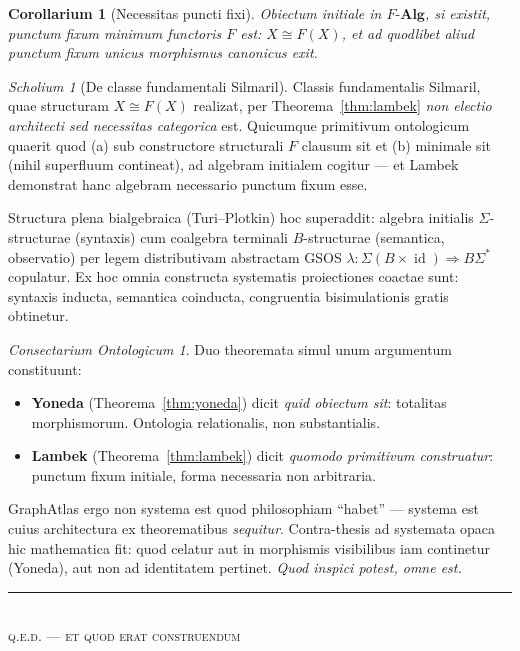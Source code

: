 \documentclass[11pt]{article}
\theoremstyle{plain}
\newtheorem{corollarium}[theorema]{Corollarium}
\theoremstyle{definition}
\theoremstyle{remark}
\newtheorem{scholium}[theorema]{Scholium}
\newtheorem*{consectarium}{Consectarium Ontologicum}
\newcommand{\id}{\operatorname{id}}
\begin{document}
\begin{corollarium}[Necessitas puncti fixi]\label{cor:fixpoint}
Obiectum initiale in $F\text{-}\mathbf{Alg}$, si existit, punctum fixum minimum functoris $F$ est: $X \cong F(X)$, et ad quodlibet aliud punctum fixum unicus morphismus canonicus exit.
\end{corollarium}

\begin{scholium}[De classe fundamentali Silmaril]
Classis fundamentalis Silmaril, quae structuram $X \cong F(X)$ realizat, per Theorema~\ref{thm:lambek} \emph{non electio architecti sed necessitas categorica} est. Quicumque primitivum ontologicum quaerit quod (a) sub constructore structurali $F$ clausum sit et (b) minimale sit (nihil superfluum contineat), ad algebram initialem cogitur --- et Lambek demonstrat hanc algebram necessario punctum fixum esse.

Structura plena bialgebraica (Turi--Plotkin) hoc superaddit: algebra initialis $\Sigma$-structurae (syntaxis) cum coalgebra terminali $B$-structurae (semantica, observatio) per legem distributivam abstractam GSOS $\lambda\colon \Sigma(B \times \id) \Rightarrow B\Sigma^{*}$ copulatur. Ex hoc omnia constructa systematis proiectiones coactae sunt: syntaxis inducta, semantica coinducta, congruentia bisimulationis gratis obtinetur.
\end{scholium}

\begin{consectarium}
Duo theoremata simul unum argumentum constituunt:
\begin{itemize}
\item \textbf{Yoneda} (Theorema~\ref{thm:yoneda}) dicit \emph{quid obiectum sit}: totalitas morphismorum. Ontologia relationalis, non substantialis.
\item \textbf{Lambek} (Theorema~\ref{thm:lambek}) dicit \emph{quomodo primitivum construatur}: punctum fixum initiale, forma necessaria non arbitraria.
\end{itemize}
GraphAtlas ergo non systema est quod philosophiam ``habet'' --- systema est cuius architectura ex theorematibus \emph{sequitur}. Contra-thesis ad systemata opaca hic mathematica fit: quod celatur aut in morphismis visibilibus iam continetur (Yoneda), aut non ad identitatem pertinet. \emph{Quod inspici potest, omne est.}
\end{consectarium}

\vspace{2em}
\begin{center}
\color{silmaril}\rule{0.3\textwidth}{0.4pt}\\[0.5em]
\textsc{q.e.d. --- et quod erat construendum}
\end{center}
\end{document}
